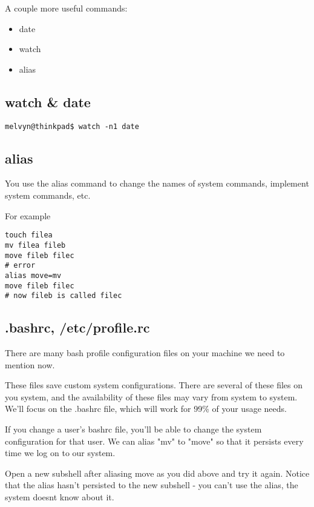 \documentclass[10pt]{article}
\begin{document}
A couple more useful commands:

\begin{itemize}
\item date
\item watch
\item alias
\end{itemize}

\subsection{ watch \& date }

\begin{lstlisting}[style=term]
melvyn@thinkpad$ watch -n1 date
\end{lstlisting}

\subsection{ alias }

You use the alias command to change the names of system commands, implement system commands, etc. 

For example

\begin{lstlisting}[style=term]
touch filea
mv filea fileb
move fileb filec
# error
alias move=mv
move fileb filec
# now fileb is called filec
\end{lstlisting}

\subsection{ .bashrc, /etc/profile.rc }

There are many bash profile configuration files on your machine we need to mention now.

These files save custom system configurations. There are several of these files
on you system, and the availability of these files may vary from system to
system. We'll focus on the .bashrc file, which will work for 99\% of your usage needs.

If you change a user's bashrc file, you'll be able to change the system configuration for that user. We can alias "mv" to "move" so that it persists every time we log on to our system.

Open a new subshell after aliasing move as you did above and try it again. Notice that the alias hasn't persisted to the new subshell - you can't use the alias, the system doesnt know about it.
\end{document}
